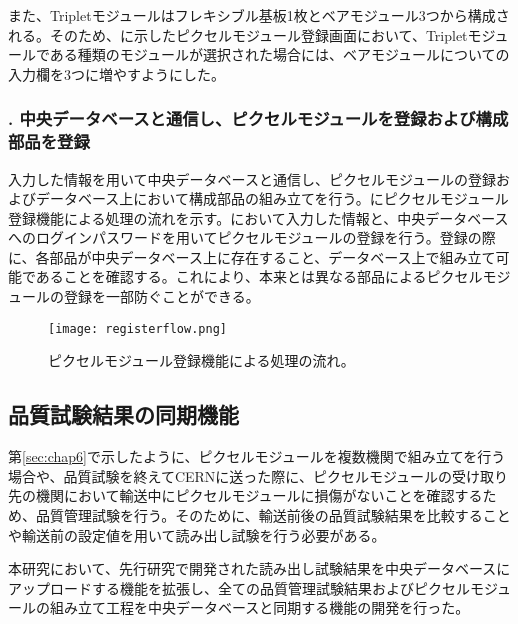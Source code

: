 また、Tripletモジュールはフレキシブル基板1枚とベアモジュール3つから構成される。そのため、に示したピクセルモジュール登録画面において、Tripletモジュールである種類のモジュールが選択された場合には、ベアモジュールについての入力欄を3つに増やすようにした。

\subsubsection{. 中央データベースと通信し、ピクセルモジュールを登録および構成部品を登録}

入力した情報を用いて中央データベースと通信し、ピクセルモジュールの登録およびデータベース上において構成部品の組み立てを行う。にピクセルモジュール登録機能による処理の流れを示す。において入力した情報と、中央データベースへのログインパスワードを用いてピクセルモジュールの登録を行う。登録の際に、各部品が中央データベース上に存在すること、データベース上で組み立て可能であることを確認する。これにより、本来とは異なる部品によるピクセルモジュールの登録を一部防ぐことができる。

\begin{figure}[tbp]
  \centering
  \texttt{[image: registerflow.png]}
  \caption[ピクセルモジュール登録機能による処理の流れ]{ピクセルモジュール登録機能による処理の流れ。}
  \label{fig:dbregistermodule}
\end{figure}


\subsection{品質試験結果の同期機能}
\label{sec:upload-result}

第\ref{sec:chap6}で示したように、ピクセルモジュールを複数機関で組み立てを行う場合や、品質試験を終えてCERNに送った際に、ピクセルモジュールの受け取り先の機関において輸送中にピクセルモジュールに損傷がないことを確認するため、品質管理試験を行う。そのために、輸送前後の品質試験結果を比較することや輸送前の設定値を用いて読み出し試験を行う必要がある。

本研究において、先行研究\cite{oku}で開発された読み出し試験結果を中央データベースにアップロードする機能を拡張し、全ての品質管理試験結果およびピクセルモジュールの組み立て工程を中央データベースと同期する機能の開発を行った。


